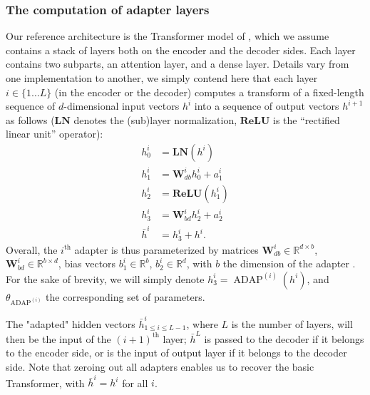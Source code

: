 \documentclass[11pt,a4paper]{article}
\newcommand{\fyTodo}[1]{\Todo[FY:]{\textcolor{orange}{#1}}}
\newcommand{\fyDone}[1]{\done[FY]\Todo[FY:]{\textcolor{orange}{#1}}}
\begin{document}
\subsubsection{The computation of adapter layers}
Our reference architecture is the Transformer model of \citet{Vaswani17attention}, which we assume contains a stack of layers both on the encoder and the decoder sides. Each layer contains two subparts, an attention layer, and a dense layer. Details vary from one implementation to another, we simply contend here that each layer $i \in \{1 \dots L\}$ (in the encoder or the decoder) computes a transform of a fixed-length sequence of $d$-dimensional input vectors $h^{i}$ into a sequence of output vectors $h^{i+1}$ as follows ($\mathbf{LN}$ denotes the (sub)layer normalization, $\mathbf{ReLU}$ is the ``rectified linear unit'' operator):\fyDone{Use align env}\fyDone{Add layer normalization, replace notation b by a}
\begin{align*}
  h^{i}_0 &= \mathbf{LN}(h^{i}) \\
  h^{i}_1 &= \mathbf{W}_{db}^{i}h_0^{i} + a^i_{1} \\
  h^{i}_2 &= \mathbf{ReLU}(h_1^{i})
  \\
  h^{i}_3 &= \mathbf{W}_{bd}^{i}h_2^{i} + a^i_{2} \\
  \bar{h}^{i} &= h^{i}_3 + h^i.
\end{align*}
Overall, the  $i^{\text{th}}$ adapter is thus parameterized by matrices $\displaystyle{\mathbf{W}_{db}^{i}\in\mathbb{R}^{d\times b}}$,$\displaystyle{\mathbf{W}_{bd}^{i}\in\mathbb{R}^{b\times d}}$, bias vectors $\displaystyle{b^i_{1} \in \mathbb{R}^{b}}$, $\displaystyle{b^i_{2} \in \mathbb{R}^{d}}$, with $b$ the dimension of the adapter \fyTodo{($d \gg b$) not true}\fyDone{Check this}. For the sake of brevity, we will simply denote $h^{i}_3 = \operatorname{ADAP}^{(i)}(h^i)$, and $\theta_{\operatorname{ADAP}^{(i)}}$ the corresponding set of parameters.\fyDone{or is it $h_i$ ?}\fyDone{attention aux matrices $W_i$}

The "adapted" hidden vectors $\bar{h}^i_{ 1\leq i \leq L-1}$, where $L$ is the number of layers, will then be the input of the $(i+1)^{\text{th}}$\fyDone{Self attention ?} layer; $\bar{h}^L$ is passed to the decoder if it belongs to the encoder side, or is the input of output layer if it belongs to the decoder side. Note that zeroing out all adapters enables us to recover the basic Transformer, with $\bar{h}^{i} = h^i$ for all $i$.
\end{document}
